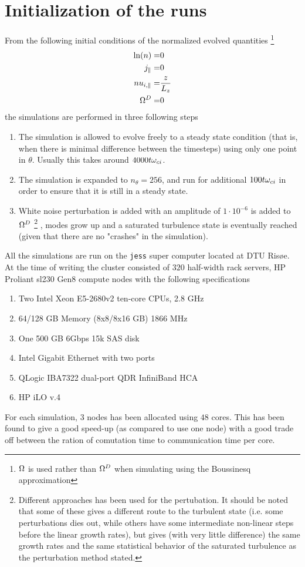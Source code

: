 \section{Initialization of the runs}
%
From the following initial conditions of the normalized evolved quantities%
%
\footnote{$\Omega$ is used rather than $\Omega^D$ when simulating using the Boussinesq approximation}%
%
\begin{align*}
    \ln(n)    =& 0\\
    j_\|      =& 0\\
    nu_{i,\|} =& \frac{z}{L_z}\\
    \Omega^D     =& 0
\end{align*}
%
the simulations are performed in three following steps
%
\begin{enumerate}[noitemsep]
    \item The simulation is allowed to evolve freely to a steady state condition (that is, when there is minimal difference between the timesteps) using only one point in $\theta$.
        Usually this takes around $4000t\omega_{ci}$.
    \item The simulation is expanded to $n_\theta = 256$, and run for additional $100t\omega_{ci}$ in order to ensure that it is still in a steady state.
    \item White noise perturbation is added with an amplitude of $1\cdot10^{-6}$ is added to $\Omega^D$%
        \footnote{Different approaches has been used for the pertubation.
            It should be noted that some of these gives a different route to the turbulent state (i.e. some perturbations dies out, while others have some intermediate non-linear steps before the linear growth rates), but gives (with very little difference) the same growth rates and the same statistical behavior of the saturated turbulence as the perturbation method stated.}%
        , modes grow up and a saturated turbulence state is eventually reached (given that there are no "crashes" in the simulation).
\end{enumerate}
%
All the simulations are run on the \texttt{jess} super computer located at DTU Ris{\o}e.
At the time of writing the cluster consisted of $320$ half-width rack servers, HP Proliant sl230 Gen8 compute nodes with the following specifications
%
\begin{enumerate}[noitemsep]
    \item Two Intel Xeon E5-2680v2 ten-core CPUs, 2.8 GHz
    \item 64/128 GB Memory (8x8/8x16 GB) 1866 MHz
    \item One 500 GB 6Gbps 15k SAS disk
    \item Intel Gigabit Ethernet with two ports
    \item QLogic IBA7322 dual-port QDR InfiniBand HCA
    \item HP iLO v.4
\end{enumerate}
%
For each simulation, $3$ nodes has been allocated using $48$ cores.
This has been found to give a good speed-up (as compared to use one node) with a good trade off between the ration of comutation time to communication time per core.

